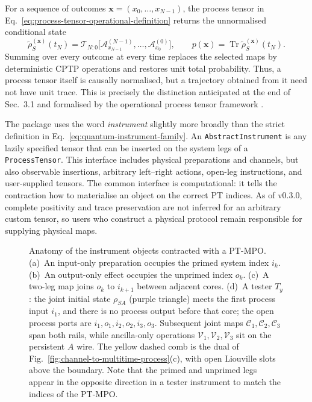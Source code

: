 For a sequence of outcomes \(\boldsymbol{x}=(x_0,\ldots,x_{N-1})\), the process tensor in Eq.~\eqref{eq:process-tensor-operational-definition} returns the unnormalised conditional state
%
\begin{equation}
    \widetilde\rho_S^{(\boldsymbol{x})}(t_N)
    = \mathcal T_{N:0} \bigl[ \mathcal A_{x_{N-1}}^{(N-1)},\ldots, \mathcal A_{x_0}^{(0)} \bigr], \qquad p(\boldsymbol{x})
    = \operatorname{Tr} \widetilde\rho_S^{(\boldsymbol{x})}(t_N).
    \label{eq:instrument-trajectory}
\end{equation}
%
Summing over every outcome at every time replaces the selected maps by deterministic CPTP operations and restores unit total probability.
Thus, a process tensor itself is causally normalised, but a trajectory obtained from it need not have unit trace.
This is precisely the distinction anticipated at the end of Sec.~3.1 and formalised by the operational process tensor framework \cite{Pollock2018Framework}.

\label{subsec:instrument-organisation}

The package uses the word \emph{instrument} slightly more broadly than the strict definition in Eq.~\eqref{eq:quantum-instrument-family}.
An \texttt{AbstractInstrument} is any lazily specified tensor that can be inserted on the system legs of a \texttt{ProcessTensor}.
This interface includes physical preparations and channels, but also observable insertions, arbitrary left--right actions, open-leg instructions, and user-supplied tensors.
The common interface is computational: it tells the contraction how to materialise an object on the correct PT indices.
As of v0.3.0, complete positivity and trace preservation are not inferred for an arbitrary custom tensor, so users who construct a physical protocol remain responsible for supplying physical maps.
%
\begin{figure}[t]
    \centering
    \scalebox{1.25}{}
    \caption{
        Anatomy of the instrument objects contracted with a PT-MPO.
        (a)~An input-only preparation occupies the primed system index \(i_k\).
        (b)~An output-only effect occupies the unprimed index \(o_k\).
        (c)~A two-leg map joins \(o_k\) to \(i_{k+1}\) between adjacent cores.
        (d)~A tester \(T_y\): the joint initial state \(\rho_{SA}\) (purple triangle) meets the first process input \(i_1\), and there is no process output before that core; the open process ports are \(i_1,o_1,i_2,o_2,i_3,o_3\).
        Subsequent joint maps \(\mathcal C_1,\mathcal C_2,\mathcal C_3\) span both rails, while ancilla-only operations \(\mathcal V_1,\mathcal V_2,\mathcal V_3\) sit on the persistent \(A\) wire.
        The yellow dashed comb is the dual of Fig.~\ref{fig:channel-to-multitime-process}(c), with open Liouville slots above the boundary.
        Note that the primed and unprimed legs appear in the opposite direction in a tester instrument to match the indices of the PT-MPO.
    }
    \label{fig:instrument-anatomy}
\end{figure}
%

